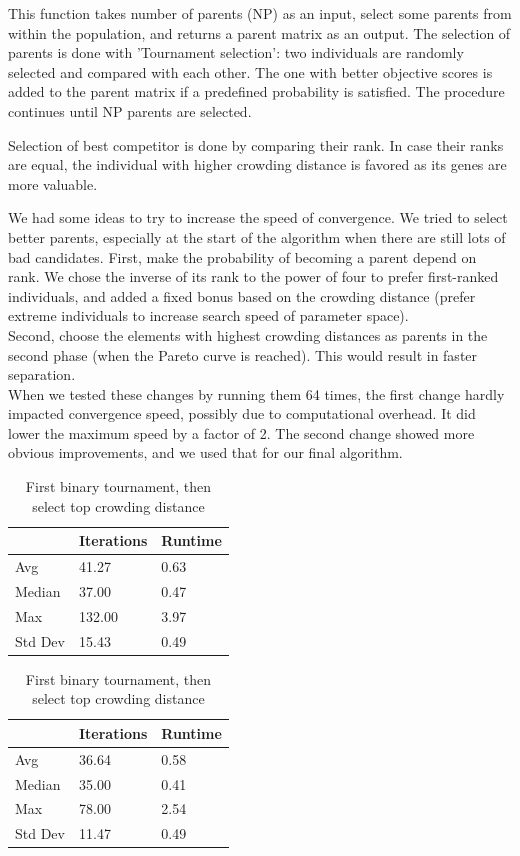 This function takes number of parents (NP) as an input, select some parents from within the population, and returns a parent matrix as an output. The selection of parents is done with 'Tournament selection': two individuals are randomly selected and compared with each other. The one with better objective scores is added to the parent matrix if a predefined probability is satisfied. The procedure continues until NP parents are selected. 

Selection of best competitor is done by comparing their rank. In case their ranks are equal, the individual with higher crowding distance is favored as its genes are more valuable.

We had some ideas to try to increase the speed of convergence. We tried to select better parents, especially at the start of the algorithm when there are still lots of bad candidates.
First, make the probability of becoming a parent depend on rank. We chose the inverse of its rank to the power of four to prefer first-ranked individuals, and added a fixed bonus based on the crowding distance (prefer extreme individuals to increase search speed of parameter space).\\
Second, choose the elements with highest crowding distances as parents in the second phase (when the Pareto curve is reached). This would result in faster separation.\\
When we tested these changes by running them 64 times, the first change hardly impacted convergence speed, possibly due to computational overhead. It did lower the maximum speed by a factor of 2.
The second change showed more obvious improvements, and we used that for our final algorithm.
\begin{table}[!htb]
	\caption{Summarizing table}
	\begin{minipage}{.5\linewidth}
		\caption{Simple binary tournament}
		\centering
		\begin{tabular}{ | l | l | l | }
			\hline
		 	 & Iterations & Runtime \\
		 	 \hline
			Avg &41.27	 &  0.63  \\
			Median &37.00 &  0.47\\
			Max &132.00	& 3.97 \\
			Std Dev & 15.43	&  0.49 \\
			\hline
		\end{tabular}
	\end{minipage}%
	\begin{minipage}{.5\linewidth}
		\centering
		\caption{First binary tournament, then select top crowding distance}
		\begin{tabular}{ |l| l | l |}
			\hline
			& Iterations & Runtime \\
			\hline
			Avg    &      36.64   &   0.58 \\
			Median      &     35.00      &      0.41    \\
			Max		&	 78.00      &     2.54  \\
			Std Dev  &   11.47   &   0.49   \\
			\hline
		\end{tabular}
	\end{minipage} 
\end{table}


